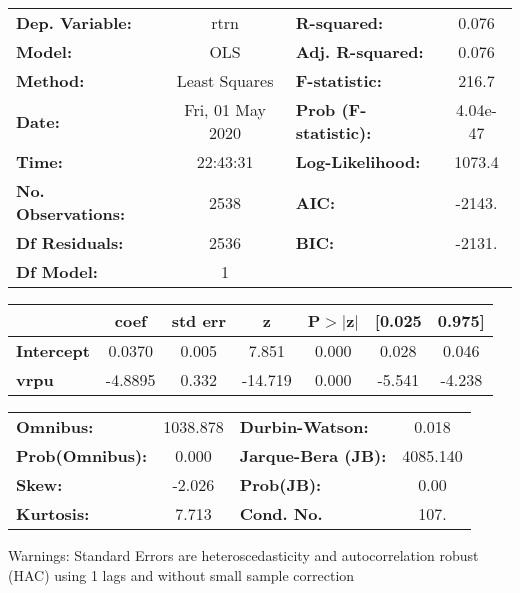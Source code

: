 \begin{center}
\begin{tabular}{lclc}
\toprule
\textbf{Dep. Variable:}    &       rtrn       & \textbf{  R-squared:         } &     0.076   \\
\textbf{Model:}            &       OLS        & \textbf{  Adj. R-squared:    } &     0.076   \\
\textbf{Method:}           &  Least Squares   & \textbf{  F-statistic:       } &     216.7   \\
\textbf{Date:}             & Fri, 01 May 2020 & \textbf{  Prob (F-statistic):} &  4.04e-47   \\
\textbf{Time:}             &     22:43:31     & \textbf{  Log-Likelihood:    } &    1073.4   \\
\textbf{No. Observations:} &        2538      & \textbf{  AIC:               } &    -2143.   \\
\textbf{Df Residuals:}     &        2536      & \textbf{  BIC:               } &    -2131.   \\
\textbf{Df Model:}         &           1      & \textbf{                     } &             \\
\bottomrule
\end{tabular}
\begin{tabular}{lcccccc}
                   & \textbf{coef} & \textbf{std err} & \textbf{z} & \textbf{P$> |$z$|$} & \textbf{[0.025} & \textbf{0.975]}  \\
\midrule
\textbf{Intercept} &       0.0370  &        0.005     &     7.851  &         0.000        &        0.028    &        0.046     \\
\textbf{vrpu}      &      -4.8895  &        0.332     &   -14.719  &         0.000        &       -5.541    &       -4.238     \\
\bottomrule
\end{tabular}
\begin{tabular}{lclc}
\textbf{Omnibus:}       & 1038.878 & \textbf{  Durbin-Watson:     } &    0.018  \\
\textbf{Prob(Omnibus):} &   0.000  & \textbf{  Jarque-Bera (JB):  } & 4085.140  \\
\textbf{Skew:}          &  -2.026  & \textbf{  Prob(JB):          } &     0.00  \\
\textbf{Kurtosis:}      &   7.713  & \textbf{  Cond. No.          } &     107.  \\
\bottomrule
\end{tabular}
\end{center}

Warnings: \newline
 [1] Standard Errors are heteroscedasticity and autocorrelation robust (HAC) using 1 lags and without small sample correction